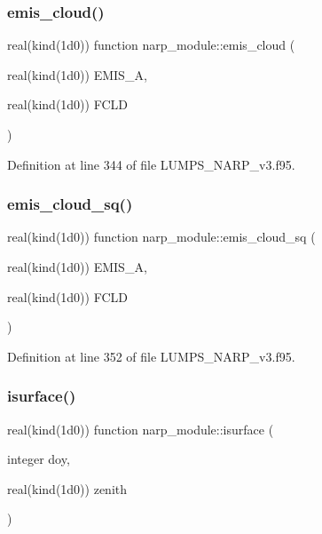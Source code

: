 \subsubsection{\texorpdfstring{emis\+\_\+cloud()}{emis\_cloud()}}
{\footnotesize\ttfamily real(kind(1d0)) function narp\+\_\+module\+::emis\+\_\+cloud (\begin{DoxyParamCaption}\item[{real(kind(1d0))}]{E\+M\+I\+S\+\_\+A,  }\item[{real(kind(1d0))}]{F\+C\+LD }\end{DoxyParamCaption})}



Definition at line 344 of file L\+U\+M\+P\+S\+\_\+\+N\+A\+R\+P\+\_\+v3.\+f95.

\mbox{\label{namespacenarp__module_a51caa7fe09922df4896ec5e4b7c564a8}} 
\subsubsection{\texorpdfstring{emis\+\_\+cloud\+\_\+sq()}{emis\_cloud\_sq()}}
{\footnotesize\ttfamily real(kind(1d0)) function narp\+\_\+module\+::emis\+\_\+cloud\+\_\+sq (\begin{DoxyParamCaption}\item[{real(kind(1d0))}]{E\+M\+I\+S\+\_\+A,  }\item[{real(kind(1d0))}]{F\+C\+LD }\end{DoxyParamCaption})}



Definition at line 352 of file L\+U\+M\+P\+S\+\_\+\+N\+A\+R\+P\+\_\+v3.\+f95.

\mbox{\label{namespacenarp__module_a67c38c5ffd466f983c36961a978ca980}} 
\subsubsection{\texorpdfstring{isurface()}{isurface()}}
{\footnotesize\ttfamily real(kind(1d0)) function narp\+\_\+module\+::isurface (\begin{DoxyParamCaption}\item[{integer}]{doy,  }\item[{real(kind(1d0))}]{zenith }\end{DoxyParamCaption})}



